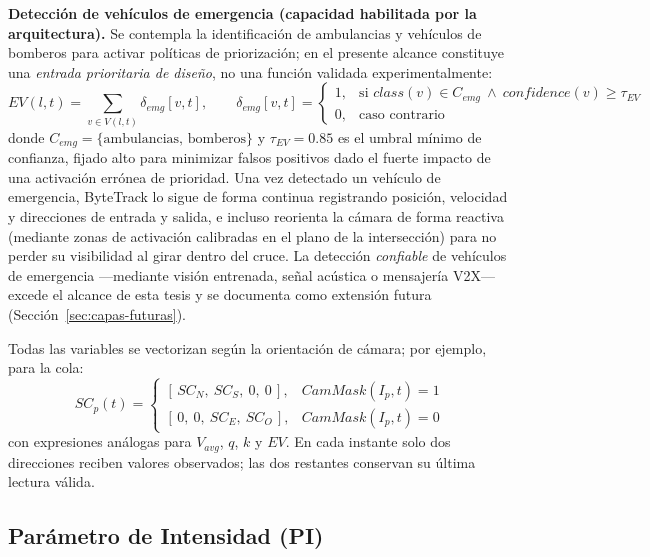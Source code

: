 \textbf{Detección de vehículos de emergencia (capacidad habilitada por la arquitectura).} Se contempla
la identificación de ambulancias y vehículos de bomberos para activar políticas de priorización; en el
presente alcance constituye una \emph{entrada prioritaria de diseño}, no una función validada
experimentalmente:
\[
EV(l,t) = \sum_{v \in V(l,t)}\delta_{emg}[v,t],
\qquad
\delta_{emg}[v,t] =
\begin{cases}
1, & \text{si } class(v)\in C_{emg}\ \land\ confidence(v)\geq \tau_{EV}\\[2pt]
0, & \text{caso contrario}
\end{cases}
\]
donde $C_{emg}=\{\text{ambulancias, bomberos}\}$ y $\tau_{EV}=0.85$ es el umbral mínimo de
confianza, fijado alto para minimizar falsos positivos dado el fuerte impacto de una
activación errónea de prioridad. Una vez detectado un vehículo de emergencia, ByteTrack lo
sigue de forma continua registrando posición, velocidad y direcciones de entrada y salida, e
incluso reorienta la cámara de forma reactiva (mediante zonas de activación calibradas en el
plano de la intersección) para no perder su visibilidad al girar dentro del cruce. La detección
\emph{confiable} de vehículos de emergencia —mediante visión entrenada, señal acústica o mensajería
V2X— excede el alcance de esta tesis y se documenta como extensión futura
(Sección~\ref{sec:capas-futuras}).

Todas las variables se vectorizan según la orientación de cámara; por ejemplo, para la cola:
\[
SC_{p}(t) =
\begin{cases}
\left[\, SC_{N},\ SC_{S},\ 0,\ 0 \,\right], & CamMask(I_{p},t) = 1\\[2pt]
\left[\, 0,\ 0,\ SC_{E},\ SC_{O} \,\right], & CamMask(I_{p},t) = 0
\end{cases}
\]
con expresiones análogas para $V_{avg}$, $q$, $k$ y $EV$. En cada instante solo dos
direcciones reciben valores observados; las dos restantes conservan su última lectura válida.

\subsection{Parámetro de Intensidad (PI)}\label{subsec:pi}


